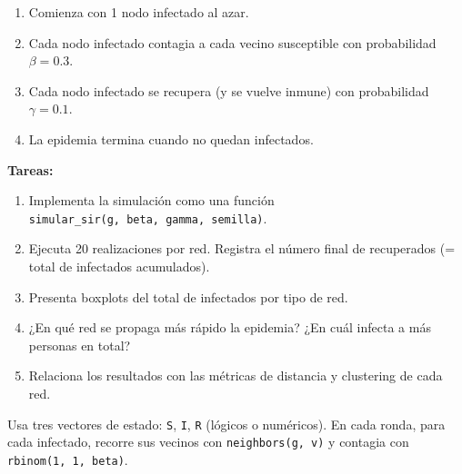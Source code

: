 \documentclass[
  letterpaper,
  DIV=11,
  numbers=noendperiod]{scrreprt}
\providecommand{\tightlist}{%
  \setlength{\itemsep}{0pt}\setlength{\parskip}{0pt}}
\begin{document}
\begin{enumerate}
\def\labelenumi{\arabic{enumi}.}
\tightlist
\item
  Comienza con 1 nodo infectado al azar.
\item
  Cada nodo infectado contagia a cada vecino susceptible con
  probabilidad \(\beta = 0.3\).
\item
  Cada nodo infectado se recupera (y se vuelve inmune) con probabilidad
  \(\gamma = 0.1\).
\item
  La epidemia termina cuando no quedan infectados.
\end{enumerate}

\textbf{Tareas:}

\begin{enumerate}
\def\labelenumi{\alph{enumi})}
\tightlist
\item
  Implementa la simulación como una función
  \texttt{simular\_sir(g,\ beta,\ gamma,\ semilla)}.
\item
  Ejecuta 20 realizaciones por red. Registra el número final de
  recuperados (= total de infectados acumulados).
\item
  Presenta boxplots del total de infectados por tipo de red.
\item
  ¿En qué red se propaga más rápido la epidemia? ¿En cuál infecta a más
  personas en total?
\item
  Relaciona los resultados con las métricas de distancia y clustering de
  cada red.
\end{enumerate}

\begin{tcolorbox}[enhanced jigsaw, toprule=.15mm, colframe=quarto-callout-note-color-frame, coltitle=black, titlerule=0mm, colback=white, breakable, leftrule=.75mm, arc=.35mm, bottomtitle=1mm, toptitle=1mm, rightrule=.15mm, bottomrule=.15mm, left=2mm, title=\textcolor{quarto-callout-note-color}{\faInfo}\hspace{0.5em}{💡 Pista 1}, colbacktitle=quarto-callout-note-color!10!white, opacityback=0, opacitybacktitle=0.6]

Usa tres vectores de estado: \texttt{S}, \texttt{I}, \texttt{R} (lógicos
o numéricos). En cada ronda, para cada infectado, recorre sus vecinos
con \texttt{neighbors(g,\ v)} y contagia con
\texttt{rbinom(1,\ 1,\ beta)}.

\end{tcolorbox}
\end{document}
